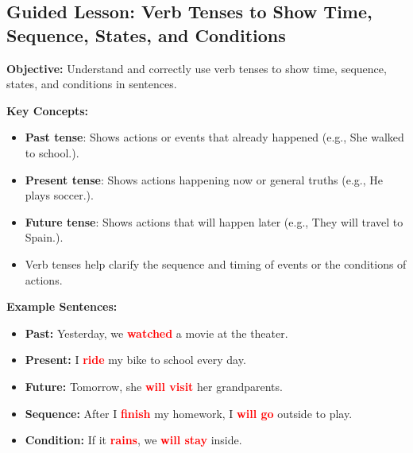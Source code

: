 \documentclass[12pt]{article}
\title{}
\date{}
\begin{document}
\subsection*{Guided Lesson: Verb Tenses to Show Time, Sequence, States, and Conditions}
\onehalfspacing

\begin{tcolorbox}[colframe=black!40, colback=gray!5, 
coltitle=black, colbacktitle=black!20, fonttitle=\bfseries\Large, 
title=Learning Objective, halign title=center, left=5pt, right=5pt, top=5pt, bottom=15pt]
\textbf{Objective:} Understand and correctly use verb tenses to show time, sequence, states, and conditions in sentences.
\end{tcolorbox}

\vspace{1em}

\begin{tcolorbox}[colframe=black!60, colback=white, 
coltitle=black, colbacktitle=black!15, fonttitle=\bfseries\Large, 
title=Key Concepts and Vocabulary, halign title=center, left=10pt, right=10pt, top=10pt, bottom=15pt]
\textbf{Key Concepts:}
\begin{itemize}
    \item \textbf{Past tense}: Shows actions or events that already happened (e.g., She walked to school.).
    \item \textbf{Present tense}: Shows actions happening now or general truths (e.g., He plays soccer.).
    \item \textbf{Future tense}: Shows actions that will happen later (e.g., They will travel to Spain.).
    \item Verb tenses help clarify the sequence and timing of events or the conditions of actions.
\end{itemize}
\end{tcolorbox}

\vspace{1em}

\begin{tcolorbox}[colframe=black!60, colback=white, 
coltitle=black, colbacktitle=black!15, fonttitle=\bfseries\Large, 
title=Examples, halign title=center, left=10pt, right=10pt, top=10pt, bottom=15pt]

\textbf{Example Sentences:}
\begin{itemize}
    \item \textbf{Past:} Yesterday, we \textbf{\textcolor{red}{watched}} a movie at the theater.
    \item \textbf{Present:} I \textbf{\textcolor{red}{ride}} my bike to school every day.
    \item \textbf{Future:} Tomorrow, she \textbf{\textcolor{red}{will visit}} her grandparents.
    \item \textbf{Sequence:} After I \textbf{\textcolor{red}{finish}} my homework, I \textbf{\textcolor{red}{will go}} outside to play.
    \item \textbf{Condition:} If it \textbf{\textcolor{red}{rains}}, we \textbf{\textcolor{red}{will stay}} inside.
\end{itemize}
\end{tcolorbox}
\end{document}
